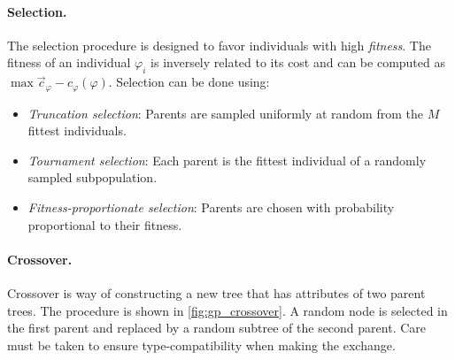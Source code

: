 \paragraph{Selection.} The selection procedure is designed to favor individuals with high \emph{fitness}. The fitness of an individual $\varphi_i$ is inversely related to its cost and can be computed as $\max \vec{c}_\varphi - c_\varphi(\varphi)$. Selection can be done using:
\begin{itemize}
    \item \emph{Truncation selection}: Parents are sampled uniformly at random from the $M$ fittest individuals.
    \item \emph{Tournament selection}: Each parent is the fittest individual of a randomly sampled subpopulation.
    \item \emph{Fitness-proportionate selection}: Parents are chosen with probability proportional to their fitness.
\end{itemize}

\paragraph{Crossover.} Crossover is way of constructing a new tree that has attributes of two parent trees. The procedure is shown in \cref{fig:gp_crossover}. A random node is selected in the first parent and replaced by a random subtree of the second parent. Care must be taken to ensure type-compatibility when making the exchange. 


